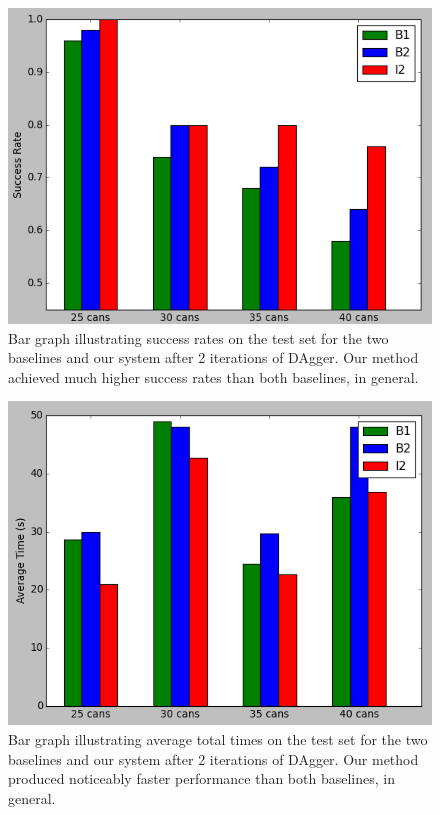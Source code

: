 \begin{figure}[h]
  \centering
    \includegraphics[scale=0.43]{images/results_bar_succ.png}
  \caption{\small{Bar graph illustrating success rates on the test set for the
two baselines and our system after 2 iterations of DAgger. Our method achieved much higher
success rates than both baselines, in general.}}
  \label{fig:results_bar_succ}
\end{figure}

\begin{figure}[h]
  \centering
    \includegraphics[scale=0.43]{images/results_bar_time.png}
  \caption{\small{Bar graph illustrating average total times on the test set for the
two baselines and our system after 2 iterations of DAgger. Our method produced noticeably faster
performance than both baselines, in general.}}
  \label{fig:results_bar_time}
\end{figure}


